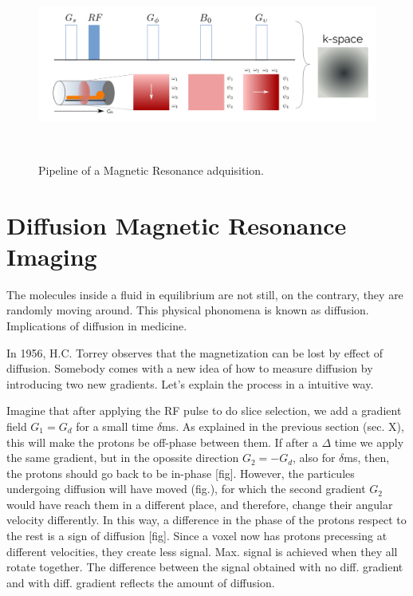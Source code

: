 \begin{figure}[h!]
                                                                                                                        
\begin{minipage}[b]{\textwidth}
    \includegraphics[width=\textwidth]{3.mri/img/kspace.png}
    \caption{Pipeline of a Magnetic Resonance adquisition.}
    \label{fig:kspace}
\end{minipage} ~

\end{figure}




\section{Diffusion Magnetic Resonance Imaging}
The molecules inside a fluid in equilibrium are not still, on the contrary, they are randomly moving around.
This physical phonomena is known as diffusion.
Implications of diffusion in medicine.

In 1956, H.C. Torrey \cite{Torrey1956} observes that the magnetization can be lost by effect of diffusion.
Somebody comes with a new idea of how to measure diffusion by introducing two new gradients.
Let's explain the process in a intuitive way.

Imagine that after applying the RF pulse to do slice selection, we add a gradient field $G_1=G_d$ for a small time $\delta$ms.
As explained in the previous section (sec. X), this will make the protons be off-phase between them.
If after a $\Delta$ time we apply the same gradient, but in the opossite direction $G_2=-G_d$, also for $\delta$ms, then, the protons should go back to be in-phase [fig].
However, the particules undergoing diffusion will have moved (fig.), for which the second gradient $G_2$ would have reach them in a different place, and therefore, change their angular velocity differently.
In this way, a difference in the phase of the protons respect to the rest is a sign of diffusion [fig].
Since a voxel now has protons precessing at different velocities, they create less signal.
Max. signal is achieved when they all rotate together.
The difference between the signal obtained with no diff. gradient and with diff. gradient reflects the amount of diffusion.


